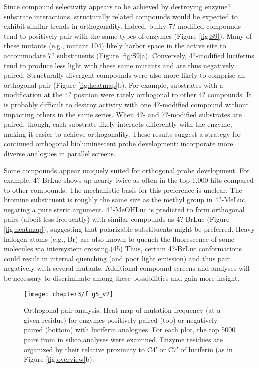 Since compound selectivity appears to be achieved by destroying enzyme?substrate interactions, structurally related compounds would be expected to exhibit similar trends in orthogonality. Indeed, bulky 7?-modified compounds tend to positively pair with the same types of enzymes (Figure \ref{fig:S9}). Many of these mutants (e.g., mutant 104) likely harbor space in the active site to accommodate 7? substituents (Figure \ref{fig:S9}a).
Conversely, 4?-modified luciferins tend to produce less light with these same mutants and are thus negatively paired. Structurally divergent compounds were also more likely to comprise an orthogonal pair (Figure \ref{fig:heatmap}b). For example, substrates with a modification at the 4? position were rarely orthogonal to other 4? compounds. It is probably difficult to destroy activity with one 4?-modified compound without impacting others in the same series. When 4?- and 7?-modified substrates are paired, though, each substrate likely interacts differently with the enzyme, making it easier to achieve orthogonality. These results suggest a strategy for continued orthogonal bioluminescent probe development: incorporate more diverse analogues in parallel screens.
\par
Some compounds appear uniquely suited for orthogonal probe development. For example, 4?-BrLuc shows up nearly twice as often in the top 1,000 hits compared to other compounds.
The mechanistic basis for this preference is unclear. The bromine substituent is roughly the same size as the methyl group in 4?-MeLuc, negating a pure steric argument. 4?-MeOHLuc is predicted to form orthogonal pairs (albeit less frequently) with similar compounds as 4?-BrLuc (Figure \ref{fig:heatmap}), suggesting that polarizable substituents might be preferred. Heavy halogen atoms (e.g., Br) are also known to quench the fluorescence of some molecules via intersystem crossing.\cite{Solovyov:2005by}(45) Thus, certain 4?-BrLuc conformations could result in internal quenching (and poor light emission) and thus pair negatively with several mutants. Additional compound screens and analyses will be necessary to discriminate among these possibilities and gain more insight.
\par
\begin{figure}[htb]
\texttt{[image: chapter3/fig5\_v2]}
\centering
\caption[Orthogonal pair analysis]{Orthogonal pair analysis. Heat map of mutation frequency (at a given residue) for enzymes positively paired (top) or negatively paired (bottom) with luciferin analogues. For each plot, the top 5000 pairs from in silico analyses were examined. Enzyme residues are organized by their relative proximity to C4′ or C7′ of luciferin (as in Figure \ref{fig:overview}b).}
  \label{fig:willsHeatmap}
\end{figure}
